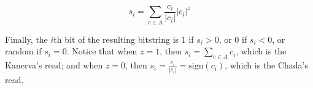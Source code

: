 $$
s_i = \sum_{c \in A} \frac{c_i}{|c_i|} |c_i|^z
$$

Finally, the $i$th bit of the resulting bitstring is 1 if $s_i > 0$, or 0 if $s_i < 0$, or random if $s_i = 0$. Notice that when $z=1$, then $s_i = \sum_{c \in A} c_i$, which is the Kanerva's read; and when $z=0$, then $s_i = \frac{c_i}{|c_i|} = \text{sign}(c_i)$, which is the Chada's read.

\begin{table}
\begin{minipage}[t]{0.5\columnwidth}%
%
\end{minipage}%
\begin{minipage}[t]{0.5\columnwidth}%
%
\end{minipage}\caption{Comparison of Kanerva's read and Chada's read. Each $\xi_{i}$ is
an activated hard location and the values come from their counters.
Gray cells' value is obtained randomly with probability 50\%.\label{tab:read-operation}}
\end{table}


